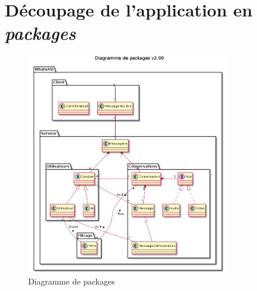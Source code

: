 \documentclass[11pt,dvipsnames,svgnames]{report}
\begin{document}
\newpage
\section{Découpage de l'application en \emph{packages}}
\begin{figure}[H]
\caption{Diagramme de packages}
\centerline{\includegraphics[width=0.8\textwidth]{diagrammes/package-diag.png}}
\end{figure}
\end{document}
